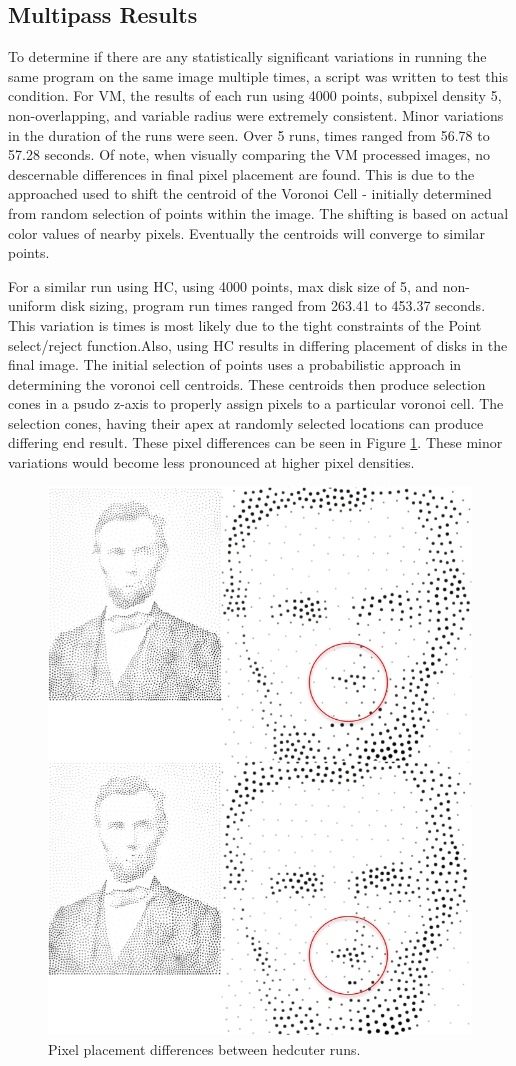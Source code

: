\documentclass[11pt]{article}
\begin{document}
\subsection{Multipass Results}
To determine if there are any statistically significant variations in running the same program on the same image multiple times, a script was written to test this condition. For VM, the results of each run using 4000 points, subpixel density 5, non-overlapping, and variable radius were extremely consistent. Minor variations in the duration of the runs were seen. Over 5 runs, times ranged from 56.78 to 57.28 seconds. Of note, when visually comparing the VM processed images, no descernable differences in final pixel placement are found. This is due to the approached used to shift the centroid of the Voronoi Cell - initially determined from random selection of points within the image. The shifting is based on actual color values of nearby pixels. Eventually the centroids will converge to similar points.

For a similar run using HC, using 4000 points, max disk size of 5, and non-uniform disk sizing, program run times ranged from 263.41 to 453.37 seconds. This variation is times is most likely due to the tight constraints of the Point select/reject function.Also, using HC results in differing placement of disks in the final image. The initial selection of points uses a probabilistic approach in determining the voronoi cell centroids. These centroids then produce selection cones in a psudo z-axis to properly assign pixels to a particular voronoi cell. The selection cones, having their apex at randomly selected locations can produce differing end result. These pixel differences can be seen in Figure \ref{fig:differences1}. These minor variations would become less pronounced at higher pixel densities.

\begin{figure}[H]
	\centering
	\includegraphics[width=0.5\linewidth]{pix/2-1_hc_differences.png}
	\caption{Pixel placement differences between hedcuter runs.}
	\label{fig:differences1}
\end{figure}
\end{document}
